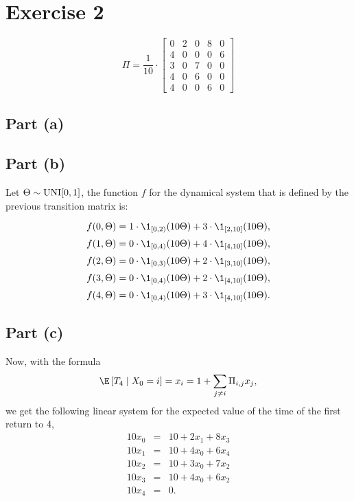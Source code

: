 \section{Exercise 2}

\[ \Pi = \frac{1}{10}\cdot \left[
\begin{array}{ccccc}
    0 & 2 & 0 & 8 & 0\\
    4 & 0 & 0 & 0 & 6\\
    3 & 0 & 7 & 0 & 0\\
    4 & 0 & 6 & 0 & 0\\
    4 & 0 & 0 & 6 & 0
\end{array}
\right] \]

\subsection*{Part (a)}
\vspace*{-5em}
\begin{figure}[H]
    \centering
    
\end{figure}


\subsection*{Part (b)}

Let $\Theta \sim \hbox{UNI}[0,1]$, the function $f$ for the dynamical system that is defined by the previous transition matrix is:

\[ f(0,\Theta) = 1\cdot \1_{[0,2)}(10\Theta) + 3\cdot\1_{[2,10]}(10\Theta) , \]
\[ f(1,\Theta) = 0\cdot \1_{[0,4)}(10\Theta) + 4\cdot\1_{[4,10]}(10\Theta) , \]
\[ f(2,\Theta) = 0\cdot \1_{[0,3)}(10\Theta) + 2\cdot\1_{[3,10]}(10\Theta) , \]
\[ f(3,\Theta) = 0\cdot \1_{[0,4)}(10\Theta) + 2\cdot\1_{[4,10]}(10\Theta) , \]
\[ f(4,\Theta) = 0\cdot \1_{[0,4)}(10\Theta) + 3\cdot\1_{[4,10]}(10\Theta) . \]

\subsection*{Part (c)}

Now, with the formula
\[ \E\left[ T_4 \;|\; X_0 = i \right] = x_i = 1 + \sum_{j\neq i} \Pi_{i,j}x_j, \]
we get the following linear system for the expected value of the time of the first return to 4,
\[ \begin{array}{rcl}
        10 x_0 & = & 10 + 2 x_1 + 8 x_3\\
        10 x_1 & = & 10 + 4 x_0 + 6 x_4\\
        10 x_2 & = & 10 + 3 x_0 + 7 x_2\\
        10 x_3 & = & 10 + 4 x_0 + 6 x_2\\
        10 x_4 & = & 0.
\end{array} \]

